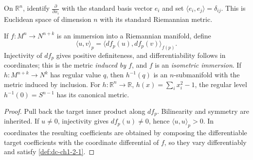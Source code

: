 \begin{example}
  \label{ex:dc-ch1-2-4}
  \leanok
  On $\mathbb{R}^n$, identify $\frac{\partial}{\partial x_i}$ with the standard
  basis vector $e_i$ and set $\langle e_i,e_j\rangle=\delta_{ij}$. This is
  Euclidean space of dimension $n$ with its standard Riemannian metric.
\end{example}

\begin{example}
  \label{ex:dc-ch1-2-5}
  \leanok
  If $f:M^n\to N^{n+k}$ is an immersion into a Riemannian manifold, define
  $$
  \langle u,v\rangle_p=\langle df_p(u),df_p(v)\rangle_{f(p)}.
  $$
  Injectivity of $df_p$ gives positive definiteness, and differentiability follows
  in coordinates; this is the metric \emph{induced by $f$}, and $f$ is an
  \emph{isometric immersion}. If $h:M^{n+k}\to N^k$ has regular value $q$, then
  $h^{-1}(q)$ is an $n$-submanifold with the metric induced by inclusion. For
  $h:\mathbb{R}^n\to\mathbb{R}$, $h(x)=\sum_i x_i^2-1$, the regular level
  $h^{-1}(0)=S^{n-1}$ has its canonical metric.
\end{example}
\begin{proof}
  \leanok
  \sketch
  Pull back the target inner product along $df_p$. Bilinearity and symmetry are
  inherited. If $u\ne0$, injectivity gives $df_p(u)\ne0$, hence
  $\langle u,u\rangle_p>0$. In coordinates the resulting coefficients are obtained
  by composing the differentiable target coefficients with the coordinate
  differential of $f$, so they vary differentiably and satisfy
  \cref{def:dc-ch1-2-1}.
\end{proof}

